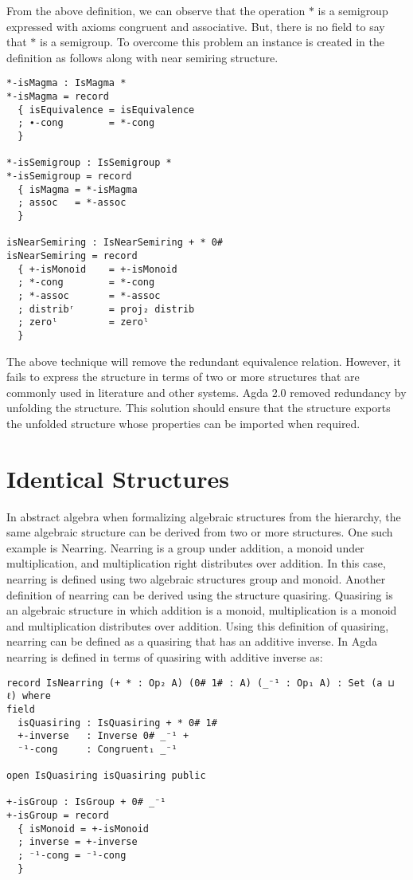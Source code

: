From the above definition, we can observe that the operation $*$ is a semigroup
expressed with axioms congruent and associative. But, there is no field to
say that $*$ is a semigroup. To overcome this problem an instance is created in
the definition as follows along with near semiring structure.

\begin{verbatim}
*-isMagma : IsMagma *
*-isMagma = record
  { isEquivalence = isEquivalence
  ; ∙-cong        = *-cong
  }

*-isSemigroup : IsSemigroup *
*-isSemigroup = record
  { isMagma = *-isMagma
  ; assoc   = *-assoc
  }

isNearSemiring : IsNearSemiring + * 0#
isNearSemiring = record
  { +-isMonoid    = +-isMonoid
  ; *-cong        = *-cong
  ; *-assoc       = *-assoc
  ; distribʳ      = proj₂ distrib
  ; zeroˡ         = zeroˡ
  }
\end{verbatim}

The above technique will remove the redundant equivalence relation. However, it
fails to express the structure in terms of two or more structures that are
commonly used in literature and other systems. Agda 2.0 removed redundancy by
unfolding the structure. This solution should ensure that the structure exports
the unfolded structure whose properties can be imported when required.

\section{Identical Structures}
In abstract algebra when formalizing algebraic structures from the hierarchy,
the same algebraic structure can be derived from two or more structures. One
such example is Nearring. Nearring is a group under addition, a monoid under
multiplication, and multiplication right distributes over addition. In this
case, nearring is defined using two algebraic structures group and monoid.
Another definition of nearring can be derived using the structure quasiring.
Quasiring is an algebraic structure in which addition is a monoid,
multiplication is a monoid and multiplication distributes over addition. Using
this definition of quasiring, nearring can be defined as a quasiring that has an
additive inverse. In Agda nearring is defined in terms of quasiring with
additive inverse as: 

\begin{verbatim}
record IsNearring (+ * : Op₂ A) (0# 1# : A) (_⁻¹ : Op₁ A) : Set (a ⊔ ℓ) where
field
  isQuasiring : IsQuasiring + * 0# 1#
  +-inverse   : Inverse 0# _⁻¹ +
  ⁻¹-cong     : Congruent₁ _⁻¹

open IsQuasiring isQuasiring public

+-isGroup : IsGroup + 0# _⁻¹
+-isGroup = record 
  { isMonoid = +-isMonoid 
  ; inverse = +-inverse 
  ; ⁻¹-cong = ⁻¹-cong 
  }
\end{verbatim}

